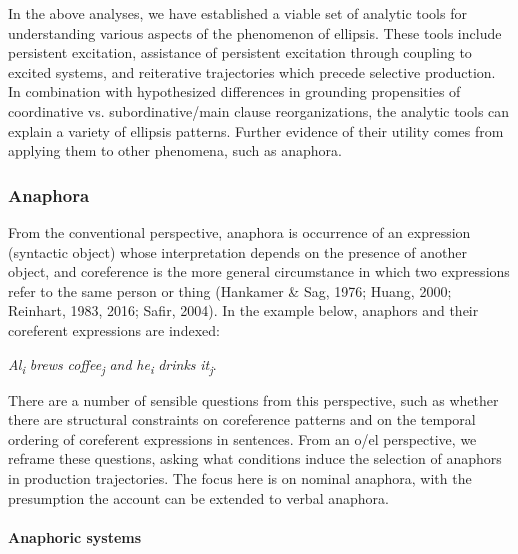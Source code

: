   In the above analyses, we have established a viable set of analytic tools for understanding various aspects of the phenomenon of ellipsis. These tools include persistent excitation, assistance of persistent excitation through coupling to excited systems, and reiterative trajectories which precede selective production. In combination with hypothesized differences in grounding propensities of coordinative vs. subordinative/main clause reorganizations, the analytic tools can explain a variety of ellipsis patterns. Further evidence of their utility comes from applying them to other phenomena, such as anaphora.

\subsubsection{Anaphora}

From the conventional perspective, anaphora is occurrence of an expression (syntactic object) whose interpretation depends on the presence of another object, and coreference is the more general circumstance in which two expressions refer to the same person or thing (Hankamer \& Sag, 1976; Huang, 2000; Reinhart, 1983, 2016; Safir, 2004). In the example below, anaphors and their coreferent expressions are indexed:

    \textit{Al\textsubscript{i}} \textit{brews} \textit{coffee\textsubscript{j}} \textit{and} \textit{he\textsubscript{i}} \textit{drinks} \textit{it\textsubscript{j}}.

  There are a number of sensible questions from this perspective, such as whether there are structural constraints on coreference patterns and on the temporal ordering of coreferent expressions in sentences. From an o/el perspective, we reframe these questions, asking what conditions induce the selection of anaphors in production trajectories. The focus here is on nominal anaphora, with the presumption the account can be extended to verbal anaphora. 

\paragraph{Anaphoric systems}


